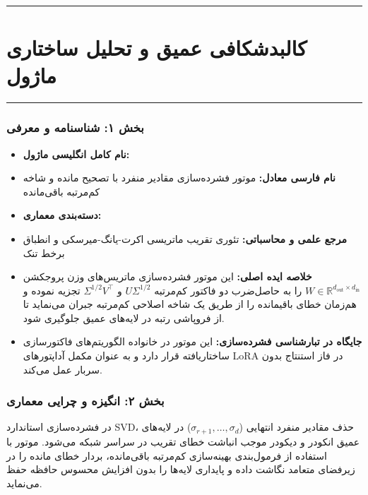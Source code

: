 \clearpage
{}
\vspace*{0.2cm}

\noindent\rule{\textwidth}{1.2pt}
\vspace*{0.1cm}
\section{کالبدشکافی عمیق و تحلیل ساختاری ماژول }
\label{sec:mod_residual_svd_compressor}
\vspace*{-0.2cm}
\noindent\rule{\textwidth}{0.5pt}
\vspace*{0.3cm}

\subsubsection*{بخش ۱: شناسنامه و معرفی }
\begin{itemize}
    \item \textbf{نام کامل انگلیسی ماژول:} 
    \item \textbf{نام فارسی معادل:} موتور فشرده‌سازی مقادیر منفرد با تصحیح مانده و شاخه کم‌مرتبه باقی‌مانده
    \item \textbf{دسته‌بندی معماری:} 
    \item \textbf{مرجع علمی و محاسباتی:} تئوری تقریب ماتریسی اکرت-یانگ-میرسکی و انطباق برخط تنک
    \item \textbf{خلاصه ایده اصلی:} این موتور فشرده‌سازی ماتریس‌های وزن پروجکشن $W \in \mathbb{R}^{d_{\text{out}} \times d_{\text{in}}}$ را به حاصل‌ضرب دو فاکتور کم‌مرتبه $U \Sigma^{1/2}$ و $\Sigma^{1/2} V^\top$ تجزیه نموده و هم‌زمان خطای باقیمانده را از طریق یک شاخه اصلاحی کم‌مرتبه جبران می‌نماید تا از فروپاشی رتبه در لایه‌های عمیق جلوگیری شود.
    \item \textbf{جایگاه در تبارشناسی فشرده‌سازی:} این موتور در خانواده الگوریتم‌های فاکتورسازی ساختاریافته قرار دارد و به عنوان مکمل آداپتورهای LoRA در فاز استنتاج بدون سربار عمل می‌کند.
\end{itemize}

\subsubsection*{بخش ۲: انگیزه و چرایی معماری }
در فشرده‌سازی استاندارد SVD، حذف مقادیر منفرد انتهایی ($\sigma_{r+1}, \dots, \sigma_d$) در لایه‌های عمیق انکودر و دیکودر موجب انباشت خطای تقریب در سراسر شبکه می‌شود. موتور  با استفاده از فرمول‌بندی بهینه‌سازی کم‌مرتبه باقی‌مانده، بردار خطای مانده را در زیرفضای متعامد نگاشت داده و پایداری لایه‌ها را بدون افزایش محسوس حافظه حفظ می‌نماید.

